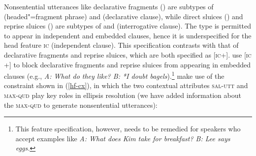 Nonsentential utterances like declarative fragments () are subtypes of
 (headed"=fragment phrase) and  (declarative clause), while direct
sluices () and reprise sluices () are subtypes of
 and  (interrogative clause). The type  is
permitted to appear in independent and embedded clauses, hence it is underspecified for the head
feature \textsc{ic} (independent clause). This specification contrasts with that of declarative
fragments and reprise sluices, which are both specified as
[\textsc{ic}+]. \citet[305]{Ginzburg:Sag:2000} use [\textsc{ic} +] to block declarative fragments
and reprise sluices from appearing in embedded clauses (e.g., \textit{A: What do they like? B: *I
  doubt bagels}).\footnote{This feature specification, however, needs to be remedied for speakers
  who accept examples like \textit{A: What does Kim take for breakfast? B: Lee says eggs.}}
%
\citet[304]{Ginzburg:Sag:2000} make use of the constraint shown in (\ref{hf-cx}), in which 
the two contextual attributes \textsc{sal-utt} and \textsc{max-qud} play key roles in ellipsis resolution
(we have added information about the \textsc{max-qud} to generate nonsentential utterances):
%

